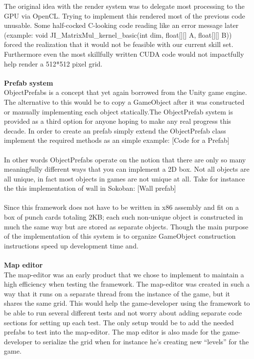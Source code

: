 \documentclass[main.tex]{subfiles}
\begin{document}
The original idea with the render system was to delegate most processing to the GPU via OpenCL. Trying to implement this rendered most of the previous code unusable. Some half-cocked C-looking code reading like an error message later (example: void JI\_MatrixMul\_kernel\_basic(int dim, float[][] A, float[][] B){})  forced the realization that it would not be feasible with our current skill set. Furthermore even the most skillfully written CUDA code would not impactfully help render a 512*512 pixel grid.
\\ \\
\textbf{Prefab system} \\%
ObjectPrefabs is a concept that yet again borrowed from the Unity game engine. 
The alternative to this would be to copy a GameObject after it was constructed or manually implementing each object statically.The ObjectPrefab system is provided as a third option for anyone hoping to make any real progress this decade. In order to create an prefab simply extend the ObjectPrefab class implement the required methods as an simple example:
	[Code for a Prefab]
\\ \\
In other words ObjectPrefabs operate on the notion that there are only so many meaningfully different ways that you can implement a 2D box. Not all objects are all unique, in fact most objects in games are not unique at all. Take for instance the this implementation of wall in Sokoban: 
	[Wall prefab]
\\ \\
Since this framework does not have to be written in x86 assembly and fit on a box of punch cards totaling 2KB; each such non-unique object is constructed in much the same way but are stored as separate objects. Though the main purpose of the implementation of this system is to organize GameObject construction instructions speed up development time and.
\\ \\
\textbf{Map editor} \\%
The map-editor was an early product that we chose to implement to maintain a high efficiency when testing the framework. The map-editor was created in such a way that it runs on a separate thread from the instance of the game, but it shares the same grid. This would help the game-developer using the framework to be able to run several different tests and not worry about adding separate code sections for setting up each test. The only setup would be to add the needed prefabs to test into the map-editor. The map editor is also made for the game-developer to serialize the grid when for instance he’s creating new “levels” for the game.
\end{document}
